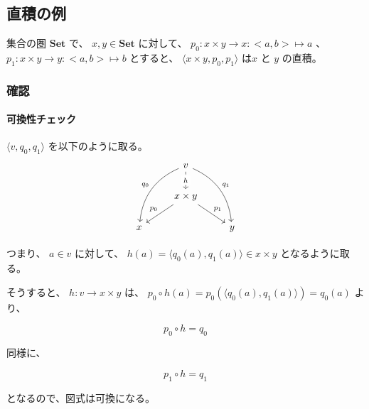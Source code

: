 \documentclass[uplatex,a4j,12pt,dvipdfmx]{jsarticle}
\begin{document}
\subsection{直積の例}

集合の圏 $\mathbf{Set}$ で、
$x,y \in \textbf{Set}$ に対して、
$p_{0}:x \times y \to x:<a,b> \mapsto a$
、
$p_{1}:x \times y \to y:<a,b> \mapsto b$
とすると、
$\langle x \times y,p_{0},p_{1} \rangle$
は$x$ と $y$ の直積。



\subsubsection{確認}

\paragraph{可換性チェック}

$\langle v ,q_{0},q_{1} \rangle$
を以下のように取る。
\[
\begin{tikzcd}
  & v \arrow[ldd, "q_{0}"', bend right] \arrow[rdd, "q_{1}", bend left] \arrow[d, "h" description, dashed] &   \\
  & x \times y \arrow[ld, "p_{0}"'] \arrow[rd, "p_{1}"]                                                                &   \\
x &                                                                                                                    & y
\end{tikzcd}
\]

つまり、
$a \in v$ に対して、 $h(a) = \langle q_{0}(a) , q_{1}(a) \rangle \in x \times y$ となるように取る。

そうすると、
$h : v \to x \times y$
は、
$p_{0} \circ h(a) = p_{0} (\langle q_{0}(a) , q_{1}(a) \rangle) = q_{0}(a)$
より、

$$p_{0} \circ h = q_{0}$$

同様に、

$$p_{1} \circ h = q_{1}$$

となるので、図式は可換になる。
\end{document}

